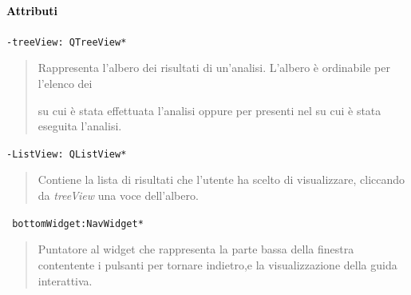 \paragraph{\textcolor{black}{Attributi\\}}
\color{teal}\verb!-treeView: QTreeView*!
\color{black}
\begin{quote}
Rappresenta l'albero dei risultati di un'analisi. L'albero è ordinabile per l'elenco dei \subject{} su cui è stata effettuata l'analisi oppure per \protocol{} presenti nel \dataset{} su cui è stata eseguita l'analisi.
\end{quote}
\color{teal}\verb!-ListView: QListView*!
\color{black}
\begin{quote}
Contiene la lista di risultati che l'utente ha scelto di visualizzare, cliccando da \emph{treeView} una voce dell'albero.
\end{quote}
\color{teal}\verb! bottomWidget:NavWidget*!
\color{black} 
\begin{quote}
Puntatore al widget che rappresenta la parte bassa della finestra contentente i pulsanti per tornare indietro,e la visualizzazione della guida interattiva.
\end{quote}
